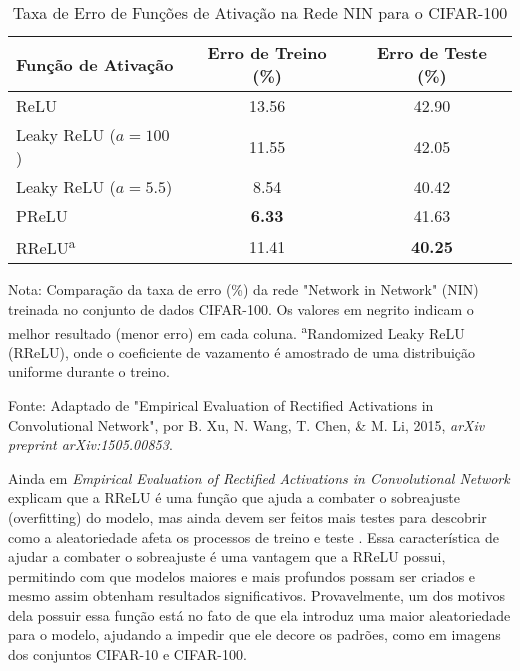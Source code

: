 \begin{table}[ht]
    \centering
    \begin{threeparttable}
        \caption{Taxa de Erro de Funções de Ativação na Rede NIN para o CIFAR-100}
        \label{tab:rrelu-cifar-100}
        \begin{tabular}{lcc}
            \toprule
            \textbf{Função de Ativação} & \textbf{Erro de Treino (\%)} & \textbf{Erro de Teste (\%)} \\
            \midrule
            
            ReLU                      & 13.56 & 42.90 \\
            \addlinespace
            Leaky ReLU ($a=100$)      & 11.55 & 42.05 \\
            Leaky ReLU ($a=5.5$)      & 8.54  & 40.42 \\
            \addlinespace
            PReLU                     & \textbf{6.33}  & 41.63 \\
            \addlinespace
            RReLU\textsuperscript{a}  & 11.41 & \textbf{40.25} \\
            
            \bottomrule
        \end{tabular}
        
        \begin{tablenotes}[para]
            \small
            \item[] Nota: Comparação da taxa de erro (\%) da rede "Network in Network" (NIN) treinada no conjunto de dados CIFAR-100. Os valores em negrito indicam o melhor resultado (menor erro) em cada coluna. \textsuperscript{a}Randomized Leaky ReLU (RReLU), onde o coeficiente de vazamento é amostrado de uma distribuição uniforme durante o treino.
            \item[] Fonte: Adaptado de "Empirical Evaluation of Rectified Activations in Convolutional Network", por B. Xu, N. Wang, T. Chen, \& M. Li, 2015, \textit{arXiv preprint arXiv:1505.00853}.
        \end{tablenotes}
        
    \end{threeparttable}
\end{table}

Ainda em \textit{Empirical Evaluation of Rectified Activations in Convolutional Network} \textcite{XuRReLU} explicam que a RReLU é uma função que ajuda a combater o sobreajuste (overfitting) do modelo, mas ainda devem ser feitos mais testes para descobrir como a aleatoriedade afeta os processos de treino e teste \parencite{XuRReLU}. Essa característica de ajudar a combater o sobreajuste é uma vantagem que a RReLU possui, permitindo com que modelos maiores e mais profundos possam ser criados e mesmo assim obtenham resultados significativos. Provavelmente, um dos motivos dela possuir essa função está no fato de que ela introduz uma maior aleatoriedade para o modelo, ajudando a impedir que ele decore os padrões, como em imagens dos conjuntos CIFAR-10 e CIFAR-100.

